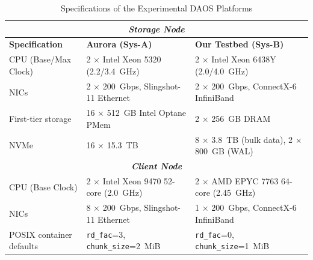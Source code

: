 \begin{table}[!htbp]
  \centering
  \caption{Specifications of the Experimental DAOS Platforms}
  \label{tab:platform-cmp}
  \renewcommand{\arraystretch}{1.1}
  \begin{tabular}{|p{7em} |p{9.6em} | p{9.6em}|}
    \hline
    \multicolumn{3}{|c|}{ \textbf{\textit{Storage Node}}} \\
    \hline
    \textbf{Specification} & \textbf{Aurora (Sys-A)} & \textbf{Our Testbed (Sys-B)}
    \\
    \hline
    CPU (Base/Max Clock)
      & 2 $\times$ Intel Xeon 5320 \newline (2.2/3.4~GHz)
      & 2 $\times$ Intel Xeon 6438Y \newline (2.0/4.0~GHz)
    \\
    \hline
    NICs
      & 2 $\times$ 200~Gbps, Slingshot-11 Ethernet
      & 2 $\times$ 200~Gbps, ConnectX-6 InfiniBand
    \\
    \hline
    First-tier storage
      & 16 $\times$ 512~GB Intel Optane PMem
      & 2 $\times$ 256~GB DRAM
    \\ \hline
    NVMe
      & 16 $\times$ 15.3~TB
      & 8 $\times$ 3.8~TB (bulk data), 2 $\times$ 800~GB (WAL) \\
    \hline
    \hline
    \multicolumn{3}{|c|}{ \textbf{\textit{Client Node}}} \\
    \hline 
     CPU \newline (Base Clock)
      & 2 $\times$ Intel Xeon 9470 52-core (2.0~GHz)
      & 2 $\times$ AMD EPYC 7763 64-core (2.45~GHz)
    \\
    \hline
    NICs
      & 8 $\times$ 200~Gbps, Slingshot-11 Ethernet
      & 1 $\times$ 200~Gbps, ConnectX-6 InfiniBand
    \\
    \hline
    POSIX container defaults
      & \texttt{rd\_fac}=3, \texttt{chunk\_size}=2~MiB
      & \texttt{rd\_fac}=0, \texttt{chunk\_size}=1~MiB
    \\
    \hline
  \end{tabular}
\end{table}

